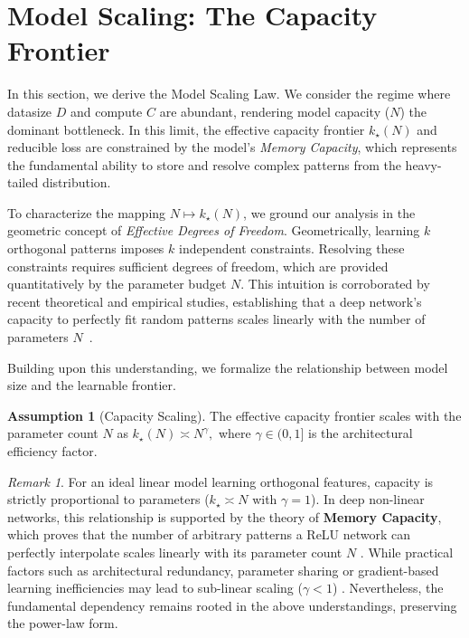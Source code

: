 \documentclass{article}
\theoremstyle{plain}
\theoremstyle{definition}
\newtheorem{assumption}[theorem]{Assumption}
\theoremstyle{remark}
\newtheorem{remark}[theorem]{Remark}
\begin{document}
\section{Model Scaling: The Capacity Frontier}
\label{subsec:model_scaling}

In this section, we derive the Model Scaling Law.
We consider the regime where datasize $D$ and compute $C$ are abundant, rendering model capacity ($N$) the dominant bottleneck. 
In this limit, the effective capacity frontier $k_\star(N)$ and reducible loss are constrained by the model's \textit{Memory Capacity}, which represents the fundamental ability to store and resolve complex patterns from the heavy-tailed distribution.

To characterize the mapping $N \mapsto k_\star(N)$, we ground our analysis in the geometric concept of \textit{Effective Degrees of Freedom}.
Geometrically, learning $k$ orthogonal patterns imposes $k$ independent constraints. Resolving these constraints requires sufficient degrees of freedom, which are provided quantitatively by the parameter budget $N$.
This intuition is corroborated by recent theoretical and empirical studies, establishing that a deep network's capacity to perfectly fit random patterns scales linearly with the number of parameters  $N$~\citep{vershynin2020memory,zhang2021understanding}.



Building upon this understanding, we formalize the relationship between model size and the learnable frontier.
\begin{assumption}[Capacity Scaling] 
    \label{assump:capacity}
    The effective capacity frontier scales with the parameter count $N$ as $k_\star(N) \asymp N^{\gamma},$ where $\gamma \in (0, 1]$ is the architectural efficiency factor.
\end{assumption}
\begin{remark}
For an ideal linear model learning orthogonal features, capacity is strictly proportional to parameters ($k_\star \asymp N$ with $\gamma=1$).
In deep non-linear networks, this relationship is supported by the theory of \textbf{Memory Capacity}, which proves that the number of arbitrary patterns a ReLU network can perfectly interpolate scales linearly with its parameter count $N$ \cite{vershynin2020memory,yun2019small}. 
While practical factors such as architectural redundancy, parameter sharing or gradient-based learning inefficiencies may lead to sub-linear scaling ($\gamma < 1$) \cite{sharma2020neuralscalinglawdimension}.
Nevertheless, the fundamental dependency remains rooted in the above understandings, preserving the power-law form.
\end{remark}
\end{document}

